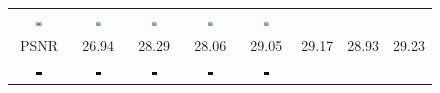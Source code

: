 \begin{figure} [tb]
\begin{tabular*}{\textwidth}{cccccccc}
    \includegraphics[width=0.12\textwidth]{./SR4VT/fig/ed/42049[4-ANR].jpg} &
 \includegraphics[width=0.12\textwidth]{./SR4VT/fig/ed/42049[5-SRCNN].jpg} &
    \includegraphics[width=0.12\textwidth]{./SR4VT/fig/ed/42049[6-A+].jpg} &
    \includegraphics[width=0.12\textwidth]{./SR4VT/fig/ed/42049[7-JOR].jpg} &
    \includegraphics[width=0.12\textwidth]{./SR4VT/fig/ed/42049[8-SRF].jpg} \\
    PSNR & 26.94 & 28.29 & 28.06 & 29.05 & 29.17 & 28.93 & 29.23 \\
 \includegraphics[width=0.12\textwidth]{./SR4VT/fig/ed/42049[1-Original]_cbd.jpg} &
 \includegraphics[width=0.12\textwidth]{./SR4VT/fig/ed/42049[2-Bicubic]_cbd.jpg} &
 \includegraphics[width=0.12\textwidth]{./SR4VT/fig/ed/42049[3-Zeyde]_cbd.jpg} &
 \includegraphics[width=0.12\textwidth]{./SR4VT/fig/ed/42049[4-ANR]_cbd.jpg} &
 \includegraphics[width=0.12\textwidth]{./SR4VT/fig/ed/42049[5-SRCNN]_cbd.jpg} &

\end{tabular*}
\end{figure}
